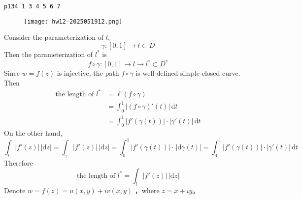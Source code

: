 \begin{lstlisting}
p134 1 3 4 5 6 7
\end{lstlisting}
\begin{exercise}
\begin{figure}[H]
\centering
\texttt{[image: hw12-2025051912.png]}
\label{}
\end{figure}
\end{exercise}
Consider the parameterization of $l$,
\[
\gamma:[0,1]\to l\subset D
\]
Then the parameterization of $l^{*}$ is
\[
f\circ \gamma:[0,1]\to l\to l^{*}\subset D^{*}
\]
Since $w=f(z)$ is injective, the path $f\circ\gamma$ is well-defined simple closed curve. Then
\[
\begin{aligned}
\text{the length of }l^{*} & =\ell(f\circ \gamma) \\
 & =\int_{0}^{1} \lvert (f\circ \gamma)'(t) \rvert  \, \mathrm{d}t \\
 & =\int_{0}^{1} \lvert f'(\gamma(t)) \rvert \cdot \lvert \gamma'(t) \rvert  \, \mathrm{d}t 
\end{aligned} 
\]
On the other hand,
\[
\int_{l}^{} \lvert f'(z) \rvert  \, \lvert \mathrm{d}z \rvert  =\int_{\gamma}^{} \lvert f'(z) \rvert  \, \lvert \mathrm{d}z \rvert =\int_{0}^{1} \lvert f'(\gamma(t)) \rvert \cdot   \, \lvert \mathrm{d}\gamma(t) \rvert  =\int_{0}^{1} \lvert f'(\gamma(t)) \rvert \cdot \lvert \gamma'(t) \rvert  \, \mathrm{d}t 
\]
Therefore
\[
\text{the length of }l^{*}=\int_{l}^{} \lvert f'(z) \rvert  \, \lvert \mathrm{d}z \rvert  
\]
Denote $w=f(z)=u(x,y)+iv(x,y)$ ，where $z=x+iy$。

